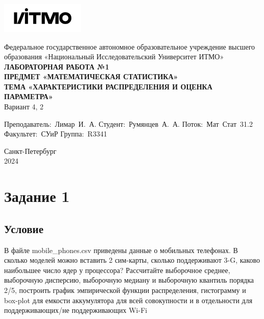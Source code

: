 \documentclass[a4paper, 12pt]{article}
\begin{document}
    \begin{titlepage}

        \begin{center}
        \includegraphics[width=0.3\textwidth]{itmo.png} %
        \vfill
        
        Федеральное государственное автономное образовательное учреждение высшего образования
        «Национальный Исследовательский Университет ИТМО»\\
        
        \vfill
        {\large\bf ЛАБОРАТОРНАЯ РАБОТА №1}\\
        {\large\bf ПРЕДМЕТ «МАТЕМАТИЧЕСКАЯ СТАТИСТИКА»}\\
        {\large\bf ТЕМА «ХАРАКТЕРИСТИКИ РАСПРЕДЕЛЕНИЯ И ОЦЕНКА ПАРАМЕТРА»}\\
        Вариант 4, 2
        \vfill

        \begin{flushright}
            \begin{minipage}{.45\textwidth}
            {
                \hbox{Преподаватель: Лимар И. А.}
                \hbox{Студент: Румянцев А. А.}
                \hbox{Поток: Мат Стат 31.2}
                \hbox{}
                \hbox{Факультет: СУиР}
                \hbox{Группа: R3341}
            }
            \end{minipage}
        \end{flushright}
        
        \vfill
                
        Санкт-Петербург\\
        2024
        \end{center}
    \end{titlepage}
    
    \tableofcontents

    \newpage
    \section{Задание 1}
    \subsection{Условие}
    В файле mobile\_{phones}.csv приведены данные о мобильных телефонах. В сколько моделей
    можно вставить 2 сим-карты, сколько поддерживают 3-G, каково наибольшее число ядер
    у процессора? Рассчитайте выборочное среднее, выборочную дисперсию, выборочную медиану
    и выборочную квантиль порядка 2/5, построить график эмпирической функции
    распределения, гистограмму и box-plot для емкости аккумулятора для всей совокупности
    и в отдельности для поддерживающих/не поддерживающих Wi-Fi
\end{document}
